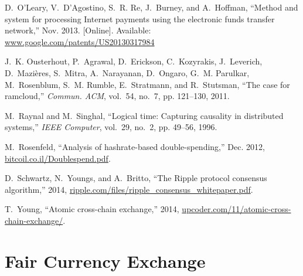 \documentclass[conference]{IEEEtran}
\begin{document}
{\begin{flushleft}
\begin{thebibliography}{10}
\BIBentryALTinterwordspacing
D.~O'Leary, V.~D'Agostino, S.~R. Re, J.~Burney, and A.~Hoffman, ``Method and
  system for processing {Internet} payments using the electronic funds
transfer
  network,'' Nov. 2013. [Online]. Available:
  \url{www.google.com/patents/US20130317984}
\BIBentrySTDinterwordspacing

J.~K. Ousterhout, P.~Agrawal, D.~Erickson, C.~Kozyrakis, J.~Leverich,
  D.~Mazi{\`{e}}res, S.~Mitra, A.~Narayanan, D.~Ongaro, G.~M. Parulkar,
  M.~Rosenblum, S.~M. Rumble, E.~Stratmann, and R.~Stutsman, ``The case for
  ramcloud,'' \emph{Commun. {ACM}}, vol.~54, no.~7, pp. 121--130, 2011.

M.~Raynal and M.~Singhal, ``Logical time: Capturing causality in distributed
  systems,'' \emph{{IEEE} Computer}, vol.~29, no.~2, pp. 49--56, 1996.

M.~Rosenfeld, ``Analysis of hashrate-based double-spending,'' Dec. 2012,
  \url{bitcoil.co.il/Doublespend.pdf}.

D.~Schwartz, N.~Youngs, and A.~Britto, ``The {Ripple} protocol consensus
  algorithm,'' 2014, \url{ripple.com/files/ripple_consensus_whitepaper.pdf}.

T.~Young, ``Atomic cross-chain exchange,'' 2014,
  \url{upcoder.com/11/atomic-cross-chain-exchange/}.

\end{thebibliography}

\end{flushleft}
}


\appendix

\section{Fair Currency Exchange}\label{sec:fair-fx}
\end{document}
